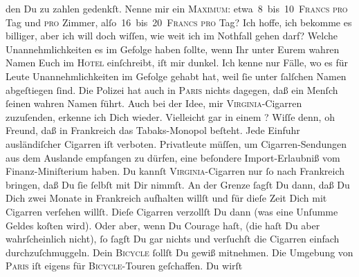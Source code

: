 \begin{ledgroupsized}[t]{13cm}
               den Du zu zahlen gedenkſt. \strikeout{\textcolor{gray}{Nenne}} Nenne mir ein \textsc{Maximum}: etwa 8 bis 10 \textsc{Francs}{ }\textsc{pro} Tag und \textsc{pro} Zimmer,
                  alſo 16 bis 20 \textsc{Francs}{ }\textsc{pro} Tag? Ich hoffe, ich bekomme es billiger, aber ich will
               doch wiſſen, wie weit ich im Nothfall gehen darf?\pend
           \pstart
           Welche Unannehmlichkeiten es im Gefolge haben ſollte, wenn Ihr unter Eurem wahren
               Namen Euch im \textsc{Hotel} einſchreibt, iſt mir dunkel. Ich kenne
               nur Fälle, wo es für Leute {\pb} Unannehmlichkeiten im Gefolge gehabt hat, weil ſie unter ſalſchen Namen
               abgeſtiegen ſind. Die Polizei hat auch in \textsc{Paris} nichts dagegen, daß ein Menſch ſeinen wahren Namen führt.\pend
           \pstart
           Auch bei der Idee, mir \textsc{Virginia}-Cigarren zuzuſenden,
               erkenne ich Dich wieder. Vielleicht gar in einem \label{K_L02806-888v}\label{K_L02806-888h}? Wiſſe denn, oh Freund, daß in Frankreich
               das Tabaks-Monopol beſteht. Jede Einfuhr 
               ausländiſcher Cigarren iſt verboten. Privatleute müſſen, um Cigarren-Sendungen  aus dem {\pb}Auslande
               empfangen zu dürfen, eine beſondere Import-Erlaubniß vom Finanz-Miniſterium haben. Du kannſt \textsc{Virginia}-Cigarren nur ſo nach Frankreich
               bringen, daß Du ſie ſelbſt mit Dir nimmſt. An der Grenze ſagſt Du dann, daß Du Dich
               zwei Monate in Frankreich aufhalten willſt und
               für dieſe Zeit Dich mit Cigarren verſehen willſt. Dieſe Cigarren verzollſt Du dann
               (was eine Unſumme  Geldes koſten wird). Oder aber,
               wenn Du Courage haſt, (die haſt Du aber wahrſcheinlich nicht), {\pb}ſo ſagſt Du gar nichts und verſuchſt die Cigarren
               einfach durchzuſchmuggeln.\pend
           \pstart
           Dein \textsc{Bicycle} ſollſt Du gewiß mitnehmen. Die Umgebung von
                  \textsc{Paris} iſt eigens für \textsc{Bicycle}-Touren geſchaffen. Du wirſt

\end{ledgroupsized}

